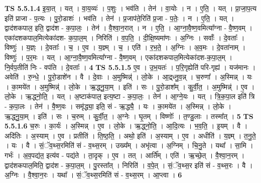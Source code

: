 \documentclass[17pt]{extarticle}
\begin{document}
                  \newline
                                \textbf{ TS 5.5.1.4} \newline
                  इ॒या॒त् । यत् । वा॒य॒व्यः॑ । प॒शुः । भव॑ति । तेन॑ । वा॒योः । न । ए॒ति॒ । यत् । प्रा॒जा॒प॒त्य इति॑ प्राजा - प॒त्यः । पु॒रो॒डाशः॑ । भव॑ति । तेन॑ । प्र॒जाप॑ते॒रिति॑ प्र॒जा - प॒तेः॒ । न । ए॒ति॒ । यत् । द्वाद॑शकपाल॒ इति॒ द्वाद॑श - क॒पा॒लः॒ । तेन॑ । वै॒श्वा॒न॒रात् । न । ए॒ति॒ । आ॒ग्ना॒वै॒ष्ण॒वमित्या᳚ग्ना - वै॒ष्ण॒वम् । एका॑दशकपाल॒मित्येका॑दश- क॒पा॒ल॒म् । निरिति॑ । व॒प॒ति॒ । दी॒क्षि॒ष्यमा॑णः । अ॒ग्निः । सर्वाः᳚ । दे॒वताः᳚ । विष्णुः॑ । य॒ज्ञ्ः । दे॒वताः᳚ । च॒ । ए॒व । य॒ज्ञ्म् । च॒ । एति॑ । र॒भ॒ते॒ । अ॒ग्निः । अ॒व॒मः । दे॒वता॑नाम् । विष्णुः॑ । प॒र॒मः । यत् । आ॒ग्ना॒वै॒ष्ण॒वमित्या᳚ग्ना - वै॒ष्ण॒वम् । एका॑दशकपाल॒मित्येका॑दश-क॒पा॒ल॒म् । नि॒र्वप॒तीति॑ निः - वप॑ति । दे॒वताः᳚ । \textbf{  4} \newline
                  \newline
                                \textbf{ TS 5.5.1.5} \newline
                  ए॒व । उ॒भ॒यतः॑ । प॒रि॒गृह्येति॑ परि-गृह्य॑ । यज॑मानः । अवेति॑ । रु॒न्धे॒ । पु॒रो॒डाशे॑न । वै । दे॒वाः । अ॒मुष्मिन्न्॑ । लो॒के । आ॒द्र्ध्नु॒व॒न्न् । च॒रुणा᳚ । अ॒स्मिन्न् । यः । का॒मये॑त । अ॒मुष्मिन्न्॑ । लो॒के । ऋ॒द्ध्नु॒या॒म् । इति॑ । सः । पु॒रो॒डाश᳚म् । कु॒र्वी॒त॒ । अ॒मुष्मिन्न्॑ । ए॒व । लो॒के । ऋ॒द्ध्नो॒ति॒ । यत् । अ॒ष्टाक॑पाल॒ इत्य॒ष्टा - क॒पा॒लः॒ । तेन॑ । आ॒ग्ने॒यः । यत् । त्रि॒क॒पा॒ल इति॑ त्रि - क॒पा॒लः । तेन॑ । वै॒ष्ण॒वः । समृ॑द्ध्या॒ इति॒ सं - ऋ॒द्ध्यै॒ । यः । का॒मये॑त । अ॒स्मिन्न् । लो॒के । ऋ॒द्ध्नु॒या॒म् । इति॑ । सः । च॒रुम् । कु॒र्वी॒त॒ । अ॒ग्नेः । घृ॒तम् । विष्णोः᳚ । त॒ण्डु॒लाः । तस्मा᳚त् । \textbf{  5} \newline
                  \newline
                                \textbf{ TS 5.5.1.6} \newline
                  च॒रुः । का॒र्यः॑ । अ॒स्मिन्न् । ए॒व । लो॒के । ऋ॒द्ध्नो॒ति॒ । आ॒दि॒त्यः । भ॒व॒ति॒ । इ॒यम् । वै । अदि॑तिः । अ॒स्याम् । ए॒व । प्रतीति॑ । ति॒ष्ठ॒ति॒ । अथो॒ इति॑ । अ॒स्याम् । ए॒व । अधीति॑ । य॒ज्ञ्म् । त॒नु॒ते॒ । यः । वै । सं॒ॅव॒थ्स॒रमिति॑ सं - व॒थ्स॒रम् । उख्य᳚म् । अभृ॑त्वा । अ॒ग्निम् । चि॒नु॒ते । यथा᳚ । सा॒मि । गर्भः॑ । अ॒व॒पद्य॑त॒ इत्य॑व - पद्य॑ते । ता॒दृक् । ए॒व । तत् । आर्ति᳚म् । एति॑ । ऋ॒च्छे॒त् । वै॒श्वा॒न॒रम् । द्वाद॑शकपाल॒मिति॒ द्वाद॑श - क॒पा॒ल॒म् । पु॒रस्ता᳚त् । निरिति॑ । व॒पे॒त् । सं॒ॅव॒थ्स॒र इति॑ सं - व॒थ्स॒रः । वै । अ॒ग्निः । वै॒श्वा॒न॒रः । यथा᳚ । सं॒ॅव॒थ्स॒रमिति॑ सं - व॒थ्स॒रम् । आ॒प्त्वा । \textbf{  6} \newline
\end{document}
